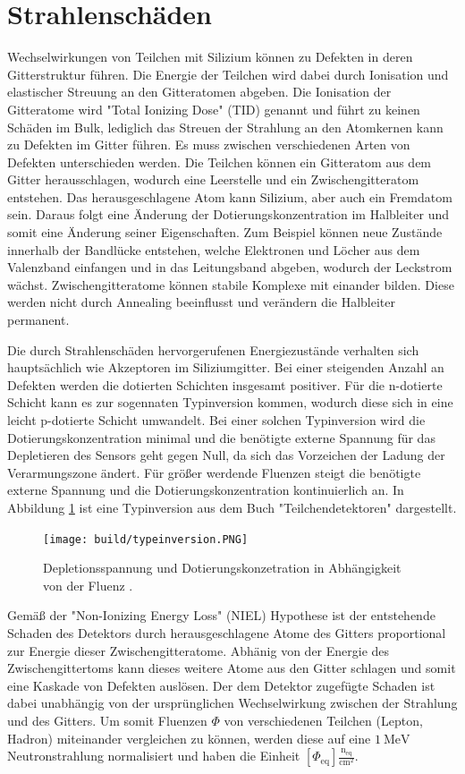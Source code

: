 \section{Strahlenschäden}
Wechselwirkungen von Teilchen mit Silizium können zu Defekten in deren
Gitterstruktur führen.
Die Energie der Teilchen wird dabei durch Ionisation und elastischer Streuung an den Gitteratomen abgeben. Die Ionisation der
Gitteratome wird "Total Ionizing Dose" (TID) genannt und führt zu keinen Schäden im Bulk, lediglich das Streuen der Strahlung an den
Atomkernen kann zu Defekten im Gitter führen.
Es muss zwischen verschiedenen Arten von Defekten unterschieden werden. Die Teilchen können ein Gitteratom aus dem
Gitter herausschlagen, wodurch eine Leerstelle und ein Zwischengitteratom entstehen. Das herausgeschlagene Atom
kann Silizium, aber auch ein Fremdatom sein. Daraus folgt eine Änderung der Dotierungskonzentration im
Halbleiter und somit eine Änderung seiner Eigenschaften. Zum Beispiel können neue Zustände innerhalb der
Bandlücke entstehen, welche Elektronen und Löcher aus dem Valenzband einfangen  und in das Leitungsband
abgeben, wodurch der Leckstrom wächst.
Zwischengitteratome können stabile Komplexe mit einander bilden. Diese werden nicht durch Annealing
beeinflusst und verändern die Halbleiter permanent.

Die durch Strahlenschäden hervorgerufenen Energiezustände verhalten sich hauptsächlich wie Akzeptoren im Siliziumgitter. Bei
einer steigenden Anzahl an Defekten werden die dotierten Schichten insgesamt positiver. Für die n-dotierte Schicht kann
es zur sogennaten Typinversion kommen, wodurch diese sich in eine leicht p-dotierte Schicht umwandelt. Bei einer
solchen Typinversion wird die Dotierungskonzentration minimal und die benötigte externe Spannung für das Depletieren des Sensors geht gegen Null, da sich
das Vorzeichen der Ladung der Verarmungszone ändert.
Für größer werdende Fluenzen steigt die benötigte externe Spannung und die
Dotierungskonzentration kontinuierlich an.
In Abbildung \ref{fig:typeinversion} ist eine Typinversion aus dem Buch "Teilchendetektoren" dargestellt.

\begin{figure}
    \texttt{[image: build/typeinversion.PNG]}
\caption{Depletionsspannung und Dotierungskonzetration in Abhängigkeit von der Fluenz \cite{typinversion}.}
\label{fig:typeinversion}
\end{figure}

Gemäß der "Non-Ionizing Energy Loss" (NIEL) Hypothese ist der entstehende Schaden des Detektors durch
herausgeschlagene Atome des Gitters proportional zur Energie dieser Zwischengitteratome.
Abhänig von der Energie des Zwischengittertoms kann dieses weitere Atome aus den Gitter schlagen und somit
eine Kaskade von Defekten auslösen. Der dem Detektor zugefügte Schaden ist dabei unabhängig von der
ursprünglichen Wechselwirkung zwischen der Strahlung und des Gitters.
Um somit Fluenzen $ \Phi$ von verschiedenen Teilchen (Lepton, Hadron) miteinander vergleichen zu können, werden diese
auf eine $\SI{1}{\mega\eV}$ Neutronstrahlung normalisiert und haben die Einheit $[\Phi_{\mathrm{eq}}]\mathrm{\frac{n_{\mathrm{eq}}}{cm^2}}$.


